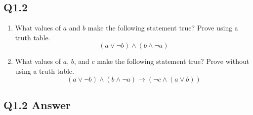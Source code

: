 \documentclass{article}
\begin{document}
\subsection*{Q1.2}
\begin{enumerate}[label=\alph*.]
    \item What values of $a$ and $b$ make the following statement true? Prove using a truth table.
    $$(a \lor \neg b) \land (b \land \neg a)$$
    \item What values of $a$, $b$, and $c$ make the following statement true? Prove without using a truth table.
    $$(a \lor \neg b) \land (b \land \neg a)\rightarrow (\neg c\land(a \lor b))$$
\end{enumerate}
\newpage
{}
\subsection*{Q1.2 Answer}
\end{document}
